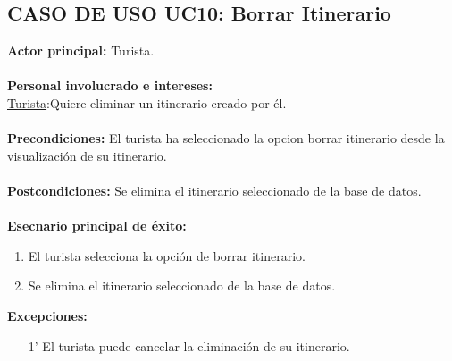 \documentclass[12pt]{article}
\begin{document}
\subsection{\textbf{CASO DE USO UC10: Borrar Itinerario}  }
\textbf{Actor principal:} Turista.\\
\\
\textbf{Personal involucrado e intereses: }\\
\underline{Turista}:Quiere eliminar un itinerario creado por él.
\\\\
\textbf{Precondiciones:} El turista ha seleccionado la opcion borrar itinerario desde la visualización de su itinerario.\\
\\
\textbf{Postcondiciones:} Se elimina el itinerario seleccionado de la base de datos.\\
\\
\textbf{Esecnario principal de éxito:}
\begin{enumerate}
\item El turista selecciona la opción de borrar itinerario.
\item Se elimina el itinerario seleccionado de la base de datos.
\end{enumerate}
\textbf{Excepciones:}
\begin{enumerate}
\item[1'] El turista puede cancelar la eliminación de su itinerario.
\end{enumerate}
\end{document}
